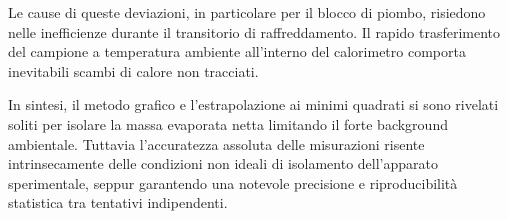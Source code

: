\documentclass[a4paper,12pt]{article}
\begin{document}
Le cause di queste deviazioni, in particolare per il blocco di piombo, risiedono nelle inefficienze durante il transitorio di raffreddamento.
Il rapido trasferimento del campione a temperatura ambiente all'interno del calorimetro comporta inevitabili scambi di calore non tracciati.

In sintesi, il metodo grafico e l'estrapolazione ai minimi quadrati si sono rivelati soliti per isolare la massa evaporata netta limitando il forte background ambientale.
Tuttavia l'accuratezza assoluta delle misurazioni risente intrinsecamente delle condizioni non ideali di isolamento dell'apparato sperimentale, seppur garantendo una notevole precisione e riproducibilità statistica tra tentativi indipendenti.
\end{document}
